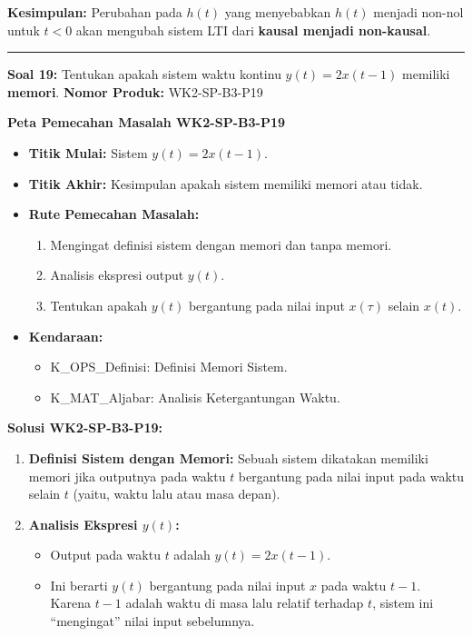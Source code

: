 \documentclass[
  letterpaper,
  DIV=11,
  numbers=noendperiod]{scrreprt}
\providecommand{\tightlist}{%
  \setlength{\itemsep}{0pt}\setlength{\parskip}{0pt}}
\begin{document}
\textbf{Kesimpulan:} Perubahan pada \(h(t)\) yang menyebabkan \(h(t)\)
menjadi non-nol untuk \(t<0\) akan mengubah sistem LTI dari
\textbf{kausal menjadi non-kausal}.

\begin{center}\rule{0.5\linewidth}{0.5pt}\end{center}

\textbf{Soal 19:} Tentukan apakah sistem waktu kontinu
\(y(t) = 2x(t-1)\) memiliki \textbf{memori}. \textbf{Nomor Produk:}
WK2-SP-B3-P19

\textbf{Peta Pemecahan Masalah WK2-SP-B3-P19}

\begin{itemize}
\tightlist
\item
  \textbf{Titik Mulai:} Sistem \(y(t) = 2x(t-1)\).
\item
  \textbf{Titik Akhir:} Kesimpulan apakah sistem memiliki memori atau
  tidak.
\item
  \textbf{Rute Pemecahan Masalah:}

  \begin{enumerate}
  \def\labelenumi{\arabic{enumi}.}
  \tightlist
  \item
    Mengingat definisi sistem dengan memori dan tanpa memori.
  \item
    Analisis ekspresi output \(y(t)\).
  \item
    Tentukan apakah \(y(t)\) bergantung pada nilai input \(x(\tau)\)
    selain \(x(t)\).
  \end{enumerate}
\item
  \textbf{Kendaraan:}

  \begin{itemize}
  \tightlist
  \item
    K\_OPS\_Definisi: Definisi Memori Sistem.
  \item
    K\_MAT\_Aljabar: Analisis Ketergantungan Waktu.
  \end{itemize}
\end{itemize}

\textbf{Solusi WK2-SP-B3-P19:}

\begin{enumerate}
\def\labelenumi{\arabic{enumi}.}
\tightlist
\item
  \textbf{Definisi Sistem dengan Memori:} Sebuah sistem dikatakan
  memiliki memori jika outputnya pada waktu \(t\) bergantung pada nilai
  input pada waktu selain \(t\) (yaitu, waktu lalu atau masa depan).
\item
  \textbf{Analisis Ekspresi \(y(t)\):}

  \begin{itemize}
  \tightlist
  \item
    Output pada waktu \(t\) adalah \(y(t) = 2x(t-1)\).
  \item
    Ini berarti \(y(t)\) bergantung pada nilai input \(x\) pada waktu
    \(t-1\). Karena \(t-1\) adalah waktu di masa lalu relatif terhadap
    \(t\), sistem ini ``mengingat'' nilai input sebelumnya.
  \end{itemize}
\end{enumerate}
\end{document}
